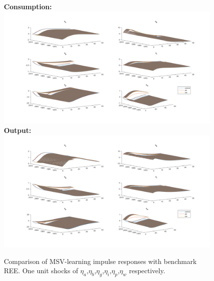 \documentclass[12pt,reqno]{article}
\numberwithin{equation}{section}
\begin{document}
\begin{figure}[H]
\caption{Comparison of MSV-learning impulse responses with benchmark REE. One unit shocks of $\eta_a$,$\eta_b$,$\eta_g$,$\eta_i$,$\eta_p$,$\eta_w$ respectively.}
\textbf{Consumption:}\\
\includegraphics[scale=0.5]{MSV_impresp_cons_3d.pdf}
\textbf{Output:}\\
\includegraphics[scale=0.5]{MSV_impresp_output_3d.pdf}
\end{figure}
\end{document}
